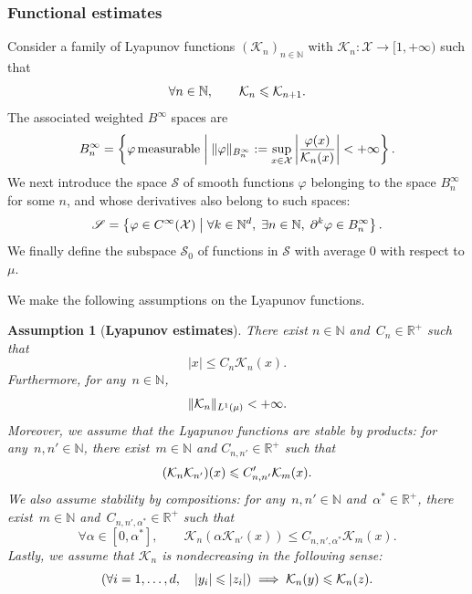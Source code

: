 \documentclass[11pt]{article}
\newcommand{\R}{\mathbb{R}}
\newcommand{\N}{\mathbb{N}}
\renewcommand{\S}{\mathscr{S}}
\renewcommand{\leq}{\leqslant}
\DeclarePairedDelimiter\norm{\lVert}{\rVert}
\DeclarePairedDelimiter\paren{\lparen}{\rparen}
\newtheorem{assumption}{Assumption}
\theoremstyle{definition}
\begin{document}
\subsubsection{Functional estimates}
\label{subsubsec:lyapunov_setting}
Consider a family of Lyapunov functions $(\mathcal{K}_n)_{n\in\N}$ with $\mathcal{K}_n \colon \mathcal{X} \to [1,+\infty)$ such that
\begin{equation}
    \notag
	\forall n\in\N, \qquad \mathcal{K}_n \leq \mathcal{K}_{n+1}.
\end{equation}
The associated weighted $B^\infty$ spaces are
\begin{equation}
    \notag
    B_n^\infty = \left\{\varphi \, \rm{measurable} \; \middle| \; \|\varphi\|_{B_n^\infty} := \sup _{x \in \mathcal{X}}\left| \frac{\varphi(x)}{\mathcal{K}_n(x)} \right| < +\infty\right\}.
\end{equation}
We next introduce the space $\S$ of smooth functions $\varphi$ belonging to the space $B^\infty_n$ for some $n$, and whose derivatives also belong to such spaces:
\begin{equation}
    \notag
    \S = \left\{\varphi \in C^\infty(\mathcal{X}) \; \middle| \; \forall k \in \mathbb{N}^d, \; \exists n \in \mathbb{N}, \; \partial^k \varphi \in B_n^\infty\right\}.
\end{equation}
We finally define the subspace $\S_0$ of functions in $\S$ with average 0 with respect to $\mu$.

We make the following assumptions on the Lyapunov functions.

\begin{assumption}[{\bf Lyapunov estimates}]
\label{as:lyapunov}
There exist $n\in\N$ and~$C_n\in\R^+$ such that
\begin{equation}
	|x| \leq C_n\mathcal{K}_n(x).
	\label{eq:lyap_identity}
\end{equation}
Furthermore, for any~$n\in\N$,
\begin{equation}
	\norm{\mathcal{K}_n}_{L^1(\mu)} < +\infty.
	\label{eq:lyap_L1}
\end{equation}
Moreover, we assume that the Lyapunov functions are stable by products: for any~$n,n'\in\N$, there exist~$m\in\N$ and $C_{n,n'}\in\R^+$ such that
\begin{equation}
	\paren*{\mathcal{K}_n\mathcal{K}_{n'}}(x) \leq C'_{n,n'}\mathcal{K}_m(x).
	\label{eq:lyap_prod}
\end{equation}
We also assume stability by compositions: for any~$n,n'\in\N$ and~$\alpha^*\in\R^+$, there exist~$m\in\N$ and~$C_{n,n',\alpha^*}\in\R^+$ such that
\begin{equation}
	\forall\alpha \in [0,\alpha^*], \qquad \mathcal{K}_n(\alpha\mathcal{K}_{n'}(x)) \leq C_{n,n',\alpha^*}\mathcal{K}_m(x).
	\label{eq:lyap_comp}
\end{equation}
Lastly, we assume that $\mathcal{K}_n$ is nondecreasing in the following sense:
\begin{equation}
    \notag
	\paren*{\forall i = 1,\dotsc,d, \quad |y_i| \leq |z_i|} \implies \mathcal{K}_n(y) \leq \mathcal{K}_n(z).
\end{equation}
\end{assumption}
\end{document}
